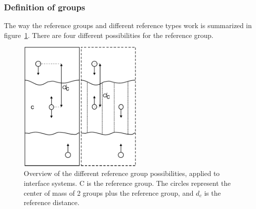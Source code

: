 \subsubsection{Definition of groups}

The way the reference groups and different reference types work is
summarized in figure~\ref{fi:pullref}. There are four different
possibilities for the reference group. 

\begin{figure}
\centerline{\includegraphics[width=6cm]{plots/pullref}}
\caption{Overview of the different reference group possibilities,
applied to interface systems. C is the reference group. The circles
represent the center of mass of 2 groups plus the reference group, and
$d_c$ is the reference distance.}
\label{fi:pullref} 
\end{figure}   

